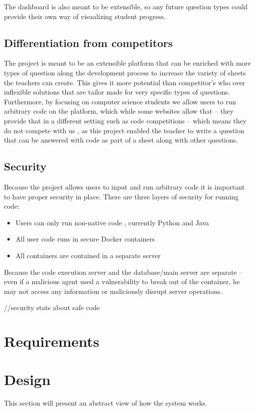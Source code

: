 \documentclass[12pt]{article}
\begin{document}
The dashboard is also meant to be extensible, so any future question types could provide their own way of visualizing student progress.

\subsection{Differentiation from competitors}
The project is meant to be an extensible platform that can be enriched with more types of question along the development process to increase the variety of sheets the teachers can create. This gives it more potential than competitor’s who over inflexible solutions that are tailor made for very specific types of questions.
Furthermore, by focusing on computer science students we allow users to run arbitrary code on the platform, which while some websites allow that – they provide that in a different setting such as code competitions – which means they do not compete with us , as this project enabled the teacher to write a question that can be answered with code as part of a sheet along with other questions.

\subsection{Security}
Because the project allows users to input and run arbitrary code it is important to have proper security in place. There are three layers of security for running code:
\begin{itemize}
\item Users can only run non-native code , currently Python and Java
\item 	All user code runs in secure Docker containers
\item	All containers are contained in a separate server
\end{itemize}
Because the code execution server and the database/main server are separate – even if a malicious agent used a vulnerability to break out of the container, he may not access any information or maliciously disrupt server operations.

//security stats about safe code


\section{Requirements}
\section{Design}
This section will present an abstract view of how the system works.
\end{document}
